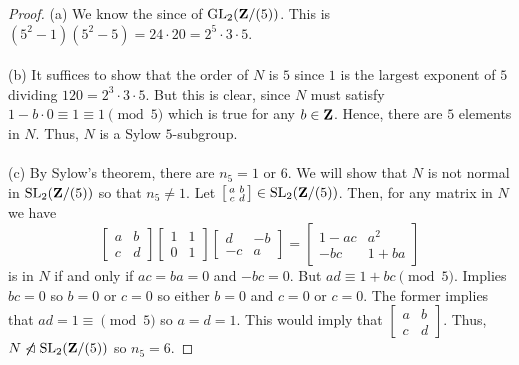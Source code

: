 \begin{proof}
(a) We know the since of $\operatorname{GL}_2(\mathbf{Z}/(5))$. This is $(5^2-1)(5^2-5)=24\cdot
20=2^5\cdot 3\cdot 5$.
\\\\
(b) It suffices to show that the order of $N$ is $5$ since $1$ is the
largest exponent of $5$ dividing $120=2^3\cdot 3\cdot 5$. But this is
clear, since $N$ must satisfy $1-b\cdot 0\equiv 1\equiv 1\pmod{5}$ which is
true for any $b\in\mathbf{Z}$. Hence, there are $5$ elements in $N$. Thus, $N$ is
a Sylow $5$-subgroup.
\\\\
(c) By Sylow's theorem, there are $n_5=1$ or $6$. We will show that $N$ is
not normal in $\operatorname{SL}_2(\mathbf{Z}/(5))$ so that $n_5\neq 1$. Let
$\left[\begin{smallmatrix}a&b\\c&d\end{smallmatrix}\right]\in\operatorname{SL}_2(\mathbf{Z}/(5))$. Then,
for any matrix in $N$ we have
\[
\begin{bmatrix}
a&b\\c&d
\end{bmatrix}
\begin{bmatrix}
1&1\\0&1
\end{bmatrix}
\begin{bmatrix}
d&-b\\
-c&a
\end{bmatrix}
=
\begin{bmatrix}
1-ac&a^2\\-bc&1+ba
\end{bmatrix}
\]
is in $N$ if and only if $ac=ba=0$ and $-bc=0$. But $ad\equiv
1+bc\pmod{5}$. Implies $bc=0$ so $b=0$ or $c=0$ so either $b=0$ and $c=0$
or $c=0$. The former implies that $ad=1\equiv\pmod{5}$ so $a=d=1$. This
would imply that
$\left[\begin{smallmatrix}a&b\\c&d\end{smallmatrix}\right]$. Thus,
$N\centernot\nlhd\SL_2(\bfZ/(5))$ so $n_5=6$.
\end{proof}

